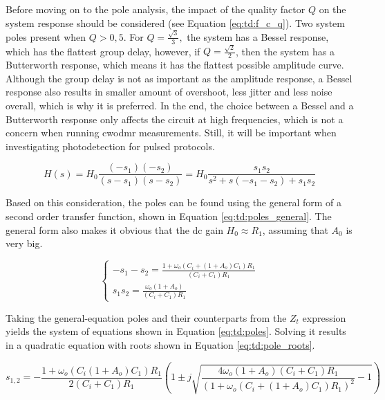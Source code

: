 Before moving on to the pole analysis, the impact of the quality factor $Q$ on the system response should be considered (see Equation \eqref{eq:td:f_c_q}). Two system poles present when $Q > 0,5$. For $Q = \frac{\sqrt{3}}{3},$ the system has a Bessel response, which has the flattest group delay, however, if $Q = \frac{\sqrt{2}}{2}$, then the system has a Butterworth response, which means it has the flattest possible amplitude curve. Although the group delay is not as important as the amplitude response, a Bessel response also results in smaller amount of overshoot, less jitter and less noise overall, which is why it is preferred. In the end, the choice between a Bessel and a Butterworth response only affects the circuit at high frequencies, which is not a concern when running \gls{cwodmr} measurements. Still, it will be important when investigating photodetection for pulsed protocols.

\begin{equation}\label{eq:td:poles_general}
	H(s) = H_0\frac{(-s_1)(-s_2)}{(s - s_1)(s - s_2)} = H_0\frac{s_1s_2}{s^2 + s(-s_1 - s_2) + s_1s_2}
\end{equation}

Based on this consideration, the poles can be found using the general form of a second order transfer function, shown in Equation \eqref{eq:td:poles_general}. The general form also makes it obvious that the \gls{dc} gain $H_0 \approx R_1$, assuming that $A_0$ is very big.


\begin{equation}\label{eq:td:poles}
	\begin{cases}
		-s_1 - s_2 = \frac{1 + \omega_o(C_i + (1 + A_o)C_1)R_1}{(C_i + C_1)R_1} \\
		s_1s_2 = \frac{\omega_o(1 + A_o)}{(C_i + C_1)R_1}
	\end{cases}
\end{equation}

Taking the general-equation poles and their counterparts from the $Z_t$ expression yields the system of equations shown in Equation \eqref{eq:td:poles}. Solving it results in a quadratic equation with roots shown in Equation \eqref{eq:td:pole_roots}.

\begin{equation}\label{eq:td:pole_roots}
	s_{1, 2} = -\frac{1 + \omega_o(C_i(1+A_o)C_1)R_1}{2(C_i + C_1)R_1}\left(1 \pm j\sqrt{\frac{4\omega_o(1 + A_o)(C_i + C_1)R_1}{(1 + \omega_o(C_i + (1 + A_o)C_1)R_1)^2} - 1}\right)
\end{equation}


